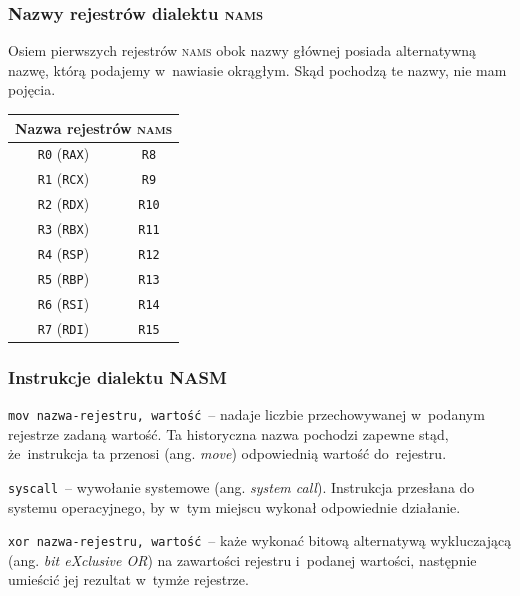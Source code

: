 \documentclass[10pt,t]{beamer}
\begin{document}
\begin{frame}
  \frametitle{Nazwy rejestrów dialektu \textsc{nams}}


  Osiem pierwszych rejestrów \textsc{nams} obok nazwy głównej posiada
  alternatywną nazwę, którą podajemy w~nawiasie okrągłym. Skąd pochodzą te
  nazwy, nie mam pojęcia.





  \begin{center}

    \begin{tabular}{|c|c|}
      \hline
      \multicolumn{2}{|c|}{Nazwa rejestrów \textsc{nams}} \\
      \hline
      \texttt{R0} (\texttt{RAX}) & \texttt{R8}\hphantom{0} \\
      \texttt{R1} (\texttt{RCX}) & \texttt{R9}\hphantom{0}  \\
      \texttt{R2} (\texttt{RDX}) & \texttt{R10} \\
      \texttt{R3} (\texttt{RBX}) & \texttt{R11} \\
      \texttt{R4} (\texttt{RSP}) & \texttt{R12} \\
      \texttt{R5} (\texttt{RBP}) & \texttt{R13} \\
      \texttt{R6} (\texttt{RSI}) & \texttt{R14} \\
      \texttt{R7} (\texttt{RDI}) & \texttt{R15} \\
      \hline
    \end{tabular}

  \end{center}

\end{frame}





\begin{frame}
  \frametitle{Instrukcje dialektu NASM}


  \texttt{mov nazwa-rejestru, wartość}~-- nadaje liczbie przechowywanej
  w~podanym rejestrze zadaną wartość. Ta historyczna nazwa pochodzi zapewne
  stąd, że~instrukcja ta przenosi (ang. \textit{move}) odpowiednią wartość
  do~rejestru.

  \texttt{syscall}~-- wywołanie systemowe (ang. \textit{system call}).
  Instrukcja przesłana do systemu operacyjnego, by w~tym miejscu wykonał
  odpowiednie działanie.

  \texttt{xor nazwa-rejestru, wartość}~-- każe wykonać bitową alternatywą
  wykluczającą (ang. \textit{bit eXclusive OR}) na zawartości rejestru
  i~podanej wartości, następnie umieścić jej rezultat w~tymże rejestrze.

\end{frame}
\end{document}
